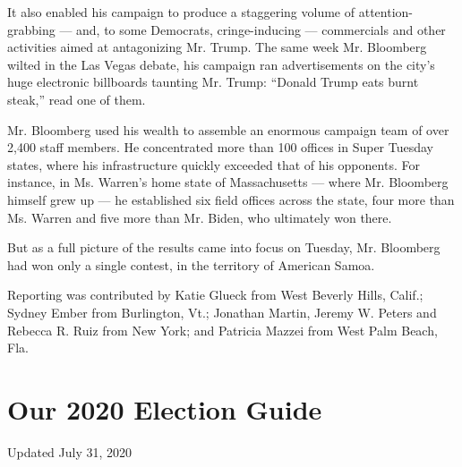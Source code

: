 It also enabled his campaign to produce a staggering volume of
attention-grabbing --- and, to some Democrats, cringe-inducing ---
commercials and other activities aimed at antagonizing Mr. Trump. The
same week Mr. Bloomberg wilted in the Las Vegas debate, his campaign ran
advertisements on the city's huge electronic billboards taunting Mr.
Trump: ``Donald Trump eats burnt steak,'' read one of them.

Mr. Bloomberg used his wealth to assemble an enormous campaign team of
over 2,400 staff members. He concentrated more than 100 offices in Super
Tuesday states, where his infrastructure quickly exceeded that of his
opponents. For instance, in Ms. Warren's home state of Massachusetts ---
where Mr. Bloomberg himself grew up --- he established six field offices
across the state, four more than Ms. Warren and five more than Mr.
Biden, who ultimately won there.

But as a full picture of the results came into focus on Tuesday, Mr.
Bloomberg had won only a single contest, in the territory of American
Samoa.

Reporting was contributed by Katie Glueck from West Beverly Hills,
Calif.; Sydney Ember from Burlington, Vt.; Jonathan Martin, Jeremy W.
Peters and Rebecca R. Ruiz from New York; and Patricia Mazzei from West
Palm Beach, Fla.

\hypertarget{our-2020-election-guide}{%
\section{Our 2020 Election Guide}\label{our-2020-election-guide}}

Updated July 31, 2020

